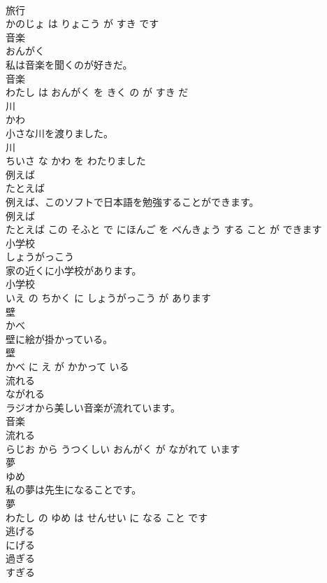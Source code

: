\documentclass[8pt]{extreport}
\begin{document}
\begin{CJK}{UTF8}{min}
\\	旅行 
\\	かのじょ は りょこう が すき です			
\\	音楽	
\\	おんがく			
\\	私は音楽を聞くのが好きだ。	
\\	音楽 
\\	わたし は おんがく を きく の が すき だ			
\\	川	
\\	かわ			
\\	小さな川を渡りました。	
\\	川 
\\	ちいさ な かわ を わたりました			
\\	例えば	
\\	たとえば			
\\	例えば、このソフトで日本語を勉強することができます。	
\\	例えば 
\\	たとえば この そふと で にほんご を べんきょう する こと が できます			
\\	小学校	
\\	しょうがっこう			
\\	家の近くに小学校があります。	
\\	小学校 
\\	いえ の ちかく に しょうがっこう が あります			
\\	壁	
\\	かべ			
\\	壁に絵が掛かっている。	
\\	壁 
\\	かべ に え が かかって いる			
\\	流れる	
\\	ながれる			
\\	ラジオから美しい音楽が流れています。	
\\	音楽 
\\	流れる 
\\	らじお から うつくしい おんがく が ながれて います			
\\	夢	
\\	ゆめ			
\\	私の夢は先生になることです。	
\\	夢 
\\	わたし の ゆめ は せんせい に なる こと です			
\\	逃げる	
\\	にげる			
\\	過ぎる	
\\	すぎる			

\end{CJK}
\end{document}
